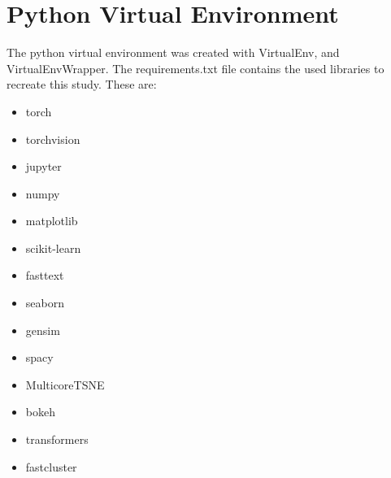 \section{Python Virtual Environment}\label{sec:Python Virtual Environment}
The python virtual environment was created with VirtualEnv, and VirtualEnvWrapper. The requirements.txt file contains the used libraries to recreate this study. These are:

\begin{itemize}
  \item torch
  \item torchvision
  \item jupyter
  \item numpy
  \item matplotlib
  \item scikit-learn
  \item fasttext
  \item seaborn
  \item gensim
  \item spacy
  \item MulticoreTSNE
  \item bokeh
  \item transformers
  \item fastcluster
\end{itemize}
